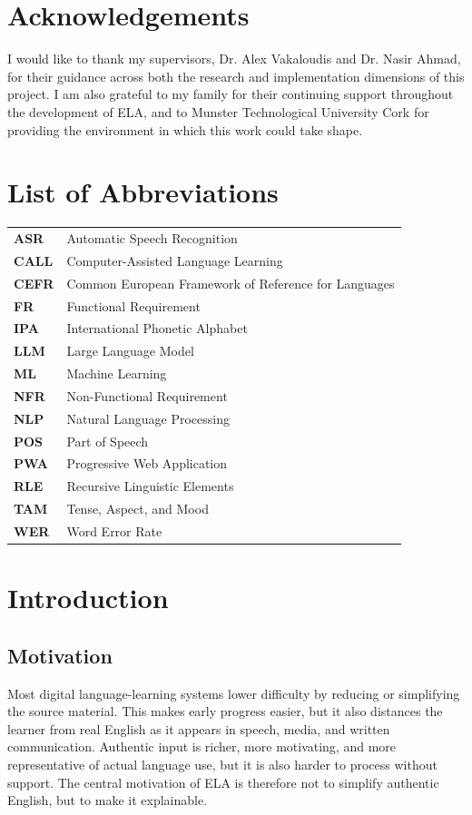 \documentclass[12pt,a4paper,oneside]{report}
\begin{document}
\chapter*{Acknowledgements}
I would like to thank my supervisors, Dr. Alex Vakaloudis and Dr. Nasir Ahmad, for their guidance across both the research and implementation dimensions of this project. I am also grateful to my family for their continuing support throughout the development of ELA, and to Munster Technological University Cork for providing the environment in which this work could take shape.

\tableofcontents
\listoffigures
\listoftables

\chapter*{List of Abbreviations}
\begin{longtable}{>{\bfseries}p{3cm}p{10cm}}
ASR & Automatic Speech Recognition \\
CALL & Computer-Assisted Language Learning \\
CEFR & Common European Framework of Reference for Languages \\
FR & Functional Requirement \\
IPA & International Phonetic Alphabet \\
LLM & Large Language Model \\
ML & Machine Learning \\
NFR & Non-Functional Requirement \\
NLP & Natural Language Processing \\
POS & Part of Speech \\
PWA & Progressive Web Application \\
RLE & Recursive Linguistic Elements \\
TAM & Tense, Aspect, and Mood \\
WER & Word Error Rate \\
\end{longtable}

\clearpage
\hypersetup{pageanchor=true}

\chapter{Introduction}
\section{Motivation}
Most digital language-learning systems lower difficulty by reducing or simplifying the source material. This makes early progress easier, but it also distances the learner from real English as it appears in speech, media, and written communication. Authentic input is richer, more motivating, and more representative of actual language use, but it is also harder to process without support. The central motivation of ELA is therefore not to simplify authentic English, but to make it explainable.
\end{document}
